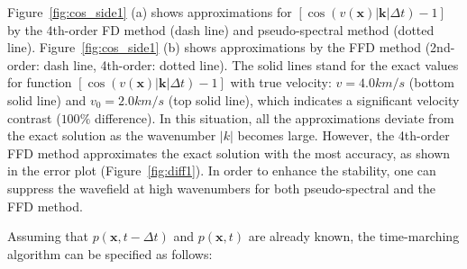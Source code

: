 Figure~\ref{fig:cos_side1} (a) shows approximations for $[\cos(v(\mathbf{x})|\mathbf{k}|\Delta t)-1]$  
by the 4th-order FD method (dash line) and pseudo-spectral method (dotted line). Figure~\ref{fig:cos_side1} (b) shows approximations by the FFD method (2nd-order: dash line, 4th-order: dotted line). 
The solid lines stand for the exact values for function $[\cos(v(\mathbf{x})|\mathbf{k}|\Delta t)-1]$ with true velocity: $v=4.0 km/s$ (bottom solid line) and $v_0=2.0 km/s$ (top solid line), which indicates a significant velocity contrast ($100\%$ difference).
In this situation, all the approximations deviate from the exact solution as the wavenumber $|k|$ becomes large.
However, the 4th-order FFD method approximates the exact solution with the most accuracy, as shown in the error plot (Figure~\ref{fig:diff1}).
In order to enhance the stability, one can suppress the wavefield at high wavenumbers for both pseudo-spectral and the FFD method. \\



Assuming that $p(\mathbf{x},t-\Delta t)$ and $p(\mathbf{x},t)$ are already known, the time-marching algorithm can be specified as follows:

